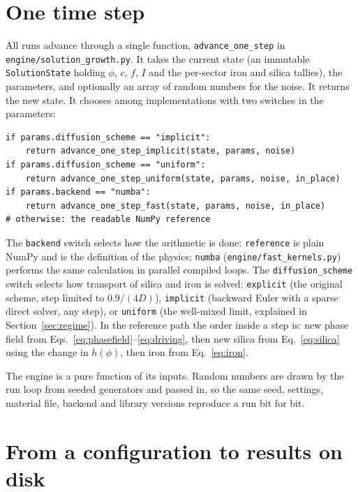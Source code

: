 \documentclass[11pt,a4paper]{article}
\newcommand{\code}[1]{\texttt{#1}}
\begin{document}
\section{One time step}\label{sec:step}

All runs advance through a single function, \code{advance\_one\_step} in \code{engine/solution\_growth.py}. It takes the current state (an immutable \code{SolutionState} holding $\phi$, $c$, $f$, $I$ and the per-sector iron and silica tallies), the parameters, and optionally an array of random numbers for the noise. It returns the new state. It chooses among implementations with two switches in the parameters:

\noindent\begin{minipage}{\linewidth}
\begin{lstlisting}
if params.diffusion_scheme == "implicit":
    return advance_one_step_implicit(state, params, noise)
if params.diffusion_scheme == "uniform":
    return advance_one_step_uniform(state, params, noise, in_place)
if params.backend == "numba":
    return advance_one_step_fast(state, params, noise, in_place)
# otherwise: the readable NumPy reference
\end{lstlisting}
\end{minipage}


\noindent The \code{backend} switch selects how the arithmetic is done: \code{reference} is plain NumPy and is the definition of the physics; \code{numba} (\code{engine/fast\_kernels.py}) performs the same calculation in parallel compiled loops. The \code{diffusion\_scheme} switch selects how transport of silica and iron is solved: \code{explicit} (the original scheme, step limited to $0.9/(4D)$), \code{implicit} (backward Euler with a sparse direct solver, any step), or \code{uniform} (the well-mixed limit, explained in Section~\ref{sec:regime}). In the reference path the order inside a step is: new phase field from Eqs.~\eqref{eq:phasefield}--\eqref{eq:driving}, then new silica from Eq.~\eqref{eq:silica} using the change in $h(\phi)$, then iron from Eq.~\eqref{eq:iron}.

The engine is a pure function of its inputs. Random numbers are drawn by the run loop from seeded generators and passed in, so the same seed, settings, material file, backend and library versions reproduce a run bit for bit.

\section{From a configuration to results on disk}\label{sec:run}
\end{document}
